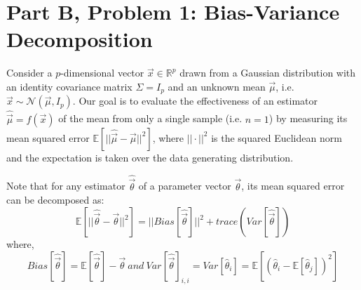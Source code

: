 \documentclass{article}
\begin{document}
\section*{Part B, Problem 1: Bias-Variance Decomposition}

Consider a $p$-dimensional vector $\vec{x}\in\mathbb{R}^p$ drawn from a Gaussian distribution with an identity covariance matrix $\Sigma=I_p$ and an unknown mean $\vec{\mu}$, i.e. $\vec{x}\sim\mathcal{N}(\vec{\mu},I_p)$. Our goal is to evaluate the effectiveness of an estimator $\hat{\vec{\mu}}=f(\vec{x})$ of the mean from only a single sample (i.e. $n=1$) by measuring its mean squared error $\mathbb{E}[||\hat{\vec{\mu}}-\vec{\mu}||^2]$, where $||\cdot||^2$ is the squared Euclidean norm and the expectation is taken over the data generating distribution.

Note that for any estimator $\hat{\vec{\theta}}$ of a parameter vector $\vec{\theta}$, its mean squared error can be decomposed as:
$$\mathbb{E}[||\hat{\vec{\theta}}-\vec{\theta}||^2] = ||Bias[\hat{\vec{\theta}}]||^2 + trace(Var[\hat{\vec{\theta}}])$$
where,
$$Bias[\hat{\vec{\theta}}] = \mathbb{E}[\hat{\vec{\theta}}] - \vec{\theta}~and~Var[\hat{\vec{\theta}}]_{i,i}=Var[\hat{\theta}_i]=\mathbb{E}[(\hat{\theta}_i-\mathbb{E}[\hat{\theta}_j])^2]$$
\end{document}
